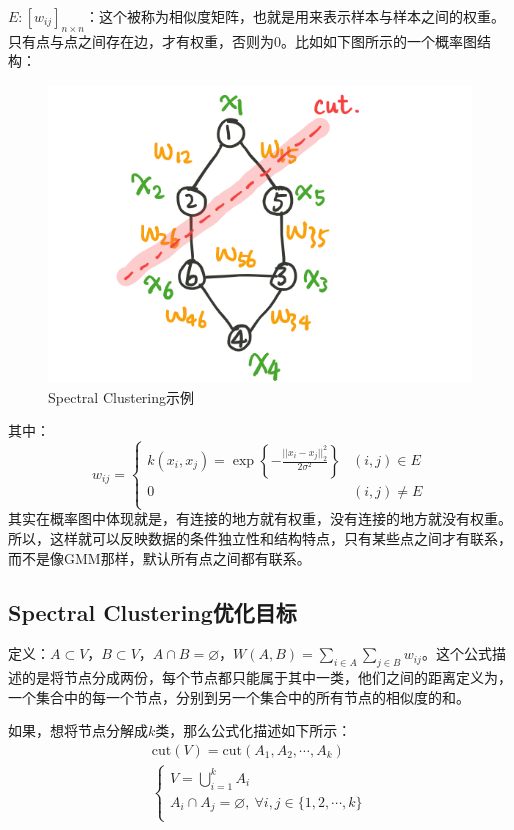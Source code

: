 \documentclass[a4paper]{article}
\begin{document}
$E:[w_{ij}]_{n\times n}$：这个被称为相似度矩阵，也就是用来表示样本与样本之间的权重。只有点与点之间存在边，才有权重，否则为0。比如如下图所示的一个概率图结构：
\begin{figure}[H]
    \centering
    \includegraphics[width=.4\textwidth]{微信图片_20200303131334.png}
    \caption{Spectral Clustering示例}
    \label{fig:my_label_1}
\end{figure}
其中：
$$
w_{ij} = 
\left\{
\begin{array}{ll}
      k(x_i,x_j) = \exp \left\{ -\frac{||x_i-x_j||^2_2}{2\sigma^2} \right\} &(i,j)\in E \\
      0 & (i,j)\neq E \\
\end{array}
\right.
$$
其实在概率图中体现就是，有连接的地方就有权重，没有连接的地方就没有权重。所以，这样就可以反映数据的条件独立性和结构特点，只有某些点之间才有联系，而不是像GMM那样，默认所有点之间都有联系。

\subsection{Spectral Clustering优化目标}
定义：$A\subset V$，$B\subset V$，$A \cap B=\varnothing$，$W(A,B)=\sum_{i\in A}\sum_{j\in B}w_{ij}$。这个公式描述的是将节点分成两份，每个节点都只能属于其中一类，他们之间的距离定义为，一个集合中的每一个节点，分别到另一个集合中的所有节点的相似度的和。

如果，想将节点分解成$k$类，那么公式化描述如下所示：
\begin{equation}
    \begin{split}
        & \mathrm{cut}(V) = \mathrm{cut}(A_1,A_2,\cdots,A_k) \\
        & \left\{
        \begin{array}{ll}
        V = \bigcup_{i=1}^k A_i & \\
        A_i \cap A_j = \varnothing, \ \forall i,j\in \{ 1,2,\cdots,k \}& \\
        \end{array}
\right.
    \end{split}
\end{equation}
\end{document}
